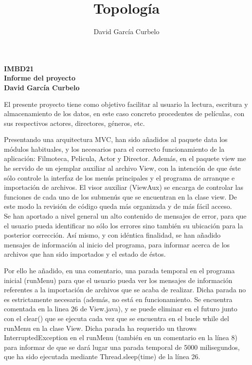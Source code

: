 \documentclass[fleqn]{article}
\author{David García Curbelo}
\title{Topología}
\begin{document}
    \doublespace

    \setcounter{page}{1}
    \pagestyle{plain}

    \begin{center}
        {\Large\bf{IMBD21}} \\
        {\large\bf{Informe del proyecto}} \\
        \bf{David García Curbelo}\\
        
    \end{center}

    El presente proyecto tiene como objetivo facilitar al usuario la lectura, escritura y almacenamiento de los datos,
    en este caso concreto procedentes de películas, con sus respectivos actores, directores, géneros, etc.

    Presentando una arquitectura MVC, han sido añadidos al paquete data los módulos habituales, y los necesarios para 
    el correcto funcionamiento de la aplicación: Filmoteca, Pelicula, Actor y Director. Además, en el paquete view me he servido 
    de un ejemplar auxiliar al archivo View, con la intención de que éste sólo controle la interfaz de los menús principales
    y el programa de arranque e importación de archivos. El visor auxiliar (ViewAux) se encarga de controlar las funciones de cada 
    uno de los submenús que se encuentran en la clase view. De este modo la revisión de código queda más organizada y de más fácil acceso.\\
    
    Se han aportado a nivel general un alto contenido de mensajes de error, para que el usuario pueda identificar no sólo los errores sino 
    también su ubicación para la posterior corrección. Así mismo, y con idéntica finalidad, se han añadido mensajes de información al inicio del programa,
    para informar acerca de los archivos que han sido importados y el estado de éstos. 
    
    Por ello he añadido, en una comentario, una parada temporal en el programa inicial (runMenu) para que el usuario pueda ver los mensajes de información 
    referentes a la importación de archivos que se acaba de realizar.
    Dicha parada no es estrictamente necesaria (además, no está en funcionamiento. Se encuentra comentada en la linea 26 de View.java), 
    y se puede eliminar en el futuro junto con el clear() que se ejecuta cada vez que se encuentra 
    en el bucle while del runMenu en la clase View. Dicha parada ha requerido un throws InterruptedException en el runMenu (también en un comentario en la línea
    8) para informar de que se dará lugar una parada temporal de 5000 milisegundos, que ha sido ejecutada mediante Thread.sleep(time) de la línea 26.
\end{document}
